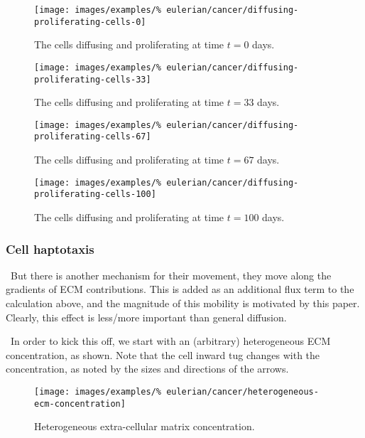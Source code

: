 \begin{figure}[!hptb]
\centering
\texttt{[image: images/examples/\%
eulerian/cancer/diffusing-proliferating-cells-0]}
\caption{The cells diffusing and proliferating at time $t=0$ days.}
\label{tumour-diffusion-proliferation-0}
\end{figure}

\begin{figure}[!hptb]
\centering
\texttt{[image: images/examples/\%
eulerian/cancer/diffusing-proliferating-cells-33]}
\caption{The cells diffusing and proliferating at time $t=33$ days.}
\label{tumour-diffusion-proliferation-33}
\end{figure}

\begin{figure}[!hptb]
\centering
\texttt{[image: images/examples/\%
eulerian/cancer/diffusing-proliferating-cells-67]}
\caption{The cells diffusing and proliferating at time $t=67$ days.}
\label{tumour-diffusion-proliferation-67}
\end{figure}

\begin{figure}[!hptb]
\centering
\texttt{[image: images/examples/\%
eulerian/cancer/diffusing-proliferating-cells-100]}
\caption{The cells diffusing and proliferating at time $t=100$ days.}
\label{tumour-diffusion-proliferation-100}
\end{figure}

\subsubsection{Cell haptotaxis}
\label{eu-cell-haptotaxis}

\textbullet\ But there is another mechanism for their movement, they
move along the gradients of ECM contributions. This is added as an
additional flux term to the calculation above, and the magnitude of
this mobility is motivated by this paper. Clearly, this effect is
less/more important than general diffusion.

\textbullet\ In order to kick this off, we start with an (arbitrary)
heterogeneous ECM concentration, as shown. Note that the cell inward
tug changes with the concentration, as noted by the sizes and
directions of the arrows.

\begin{figure}[!hptb]
\centering
\texttt{[image: images/examples/\%
eulerian/cancer/heterogeneous-ecm-concentration]}
\caption{Heterogeneous extra-cellular matrix concentration.}
\label{heterogeneous-ecm-concentration}
\end{figure}

